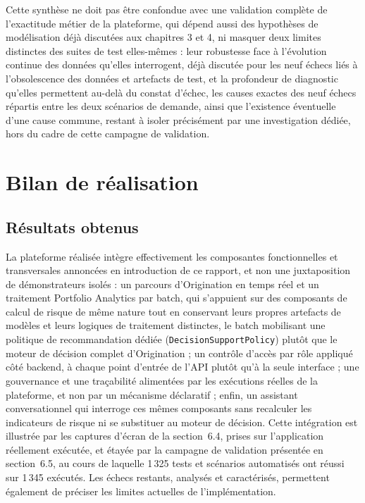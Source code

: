 Cette synthèse ne doit pas être confondue avec une validation complète de l'exactitude métier de la plateforme, qui dépend aussi des hypothèses de modélisation déjà discutées aux chapitres 3 et 4, ni masquer deux limites distinctes des suites de test elles-mêmes : leur robustesse face à l'évolution continue des données qu'elles interrogent, déjà discutée pour les neuf échecs liés à l'obsolescence des données et artefacts de test, et la profondeur de diagnostic qu'elles permettent au-delà du constat d'échec, les causes exactes des neuf échecs répartis entre les deux scénarios de demande, ainsi que l'existence éventuelle d'une cause commune, restant à isoler précisément par une investigation dédiée, hors du cadre de cette campagne de validation.

\section{Bilan de réalisation}

\subsection{Résultats obtenus}

La plateforme réalisée intègre effectivement les composantes fonctionnelles et transversales annoncées en introduction de ce rapport, et non une juxtaposition de démonstrateurs isolés : un parcours d'Origination en temps réel et un traitement Portfolio Analytics par batch, qui s'appuient sur des composants de calcul de risque de même nature tout en conservant leurs propres artefacts de modèles et leurs logiques de traitement distinctes, le batch mobilisant une politique de recommandation dédiée (\texttt{DecisionSupportPolicy}) plutôt que le moteur de décision complet d'Origination ; un contrôle d'accès par rôle appliqué côté backend, à chaque point d'entrée de l'API plutôt qu'à la seule interface ; une gouvernance et une traçabilité alimentées par les exécutions réelles de la plateforme, et non par un mécanisme déclaratif ; enfin, un assistant conversationnel qui interroge ces mêmes composants sans recalculer les indicateurs de risque ni se substituer au moteur de décision. Cette intégration est illustrée par les captures d'écran de la section~6.4, prises sur l'application réellement exécutée, et étayée par la campagne de validation présentée en section~6.5, au cours de laquelle 1\,325 tests et scénarios automatisés ont réussi sur 1\,345 exécutés. Les échecs restants, analysés et caractérisés, permettent également de préciser les limites actuelles de l'implémentation.

